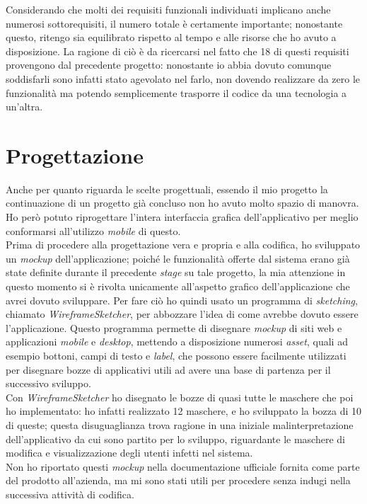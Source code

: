Considerando che molti dei requisiti funzionali individuati implicano anche numerosi sottorequisiti, il numero totale è certamente importante; nonostante questo, ritengo sia equilibrato rispetto al tempo e alle risorse che ho avuto a disposizione. La ragione di ciò è da ricercarsi nel fatto che 18 di questi requisiti provengono dal precedente progetto: nonostante io abbia dovuto comunque soddisfarli sono infatti stato agevolato nel farlo, non dovendo realizzare da zero le funzionalità ma potendo semplicemente trasporre il codice da una tecnologia a un'altra.


\section{Progettazione}

Anche per quanto riguarda le scelte progettuali, essendo il mio progetto la continuazione di un progetto già concluso non ho avuto molto spazio di manovra. Ho però potuto riprogettare l'intera interfaccia grafica dell'applicativo per meglio conformarsi all'utilizzo \textit{mobile} di questo. \\
Prima di procedere alla progettazione vera e propria e alla codifica, ho sviluppato un \textit{mockup} dell'applicazione; poiché le funzionalità offerte dal sistema erano già state definite durante il precedente \textit{stage} su tale progetto, la mia attenzione in questo momento si è rivolta unicamente all'aspetto grafico dell'applicazione che avrei dovuto sviluppare. Per fare ciò ho quindi usato un programma di \textit{sketching}, chiamato \textit{WireframeSketcher}, per abbozzare l'idea di come avrebbe dovuto essere l'applicazione. Questo programma permette di disegnare \textit{mockup} di siti web e applicazioni \textit{mobile} e \textit{desktop}, mettendo a disposizione numerosi \textit{asset}, quali ad esempio bottoni, campi di testo e \textit{label}, che possono essere facilmente utilizzati per disegnare bozze di applicativi utili ad avere una base di partenza per il successivo sviluppo. \\
Con \textit{WireframeSketcher} ho disegnato le bozze di quasi tutte le maschere che poi ho implementato: ho infatti realizzato 12 maschere, e ho sviluppato la bozza di 10 di queste; questa disuguaglianza trova ragione in una iniziale malinterpretazione dell'applicativo da cui sono partito per lo sviluppo, riguardante le maschere di modifica e visualizzazione degli utenti infetti nel sistema. \\
Non ho riportato questi \textit{mockup} nella documentazione ufficiale fornita come parte del prodotto all'azienda, ma mi sono stati utili per procedere senza indugi nella successiva attività di codifica. \\

